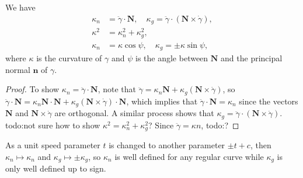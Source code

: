 \begin{prop}
    We have 
    \begin{align*}
        \kappa_n &=\ddot \gamma \cdot \mathbf N,\quad \kappa_g = \ddot \gamma \cdot (\mathbf N\times \dot \gamma ),\\
        \kappa^2&=\kappa_n ^2+\kappa_g^2,\\
        \kappa_n &=\kappa \cos \psi, \quad \kappa_g =\pm \kappa\sin \psi,
    \end{align*}
    where $\kappa$ is the curvature of $\gamma $ and $\psi$ is the angle between $\mathbf N$ and the principal normal $\mathbf n$ of $\gamma $.
\end{prop}
\begin{proof}
    To show $\kappa_n =\ddot \gamma \cdot \mathbf N$, note that $\ddot \gamma =\kappa_n \mathbf N+\kappa_g(\mathbf N\times \dot \gamma )$, so $\ddot \gamma \cdot \mathbf N=\kappa_n \mathbf N\cdot \mathbf N+\kappa_g (\mathbf N\times \dot \gamma )\cdot \mathbf N$, which implies that $\ddot \gamma \cdot \mathbf N=\kappa_n $ since the vectors $\mathbf N$ and $\mathbf N\times \dot\gamma $ are orthogonal. A similar process shows that $\kappa_g=\ddot \gamma \cdot (\mathbf N\times \dot \gamma )$. {\color{red}todo:not sure how to show $\kappa^2=\kappa_n ^2+\kappa_g^2$?} Since $\ddot \gamma =\kappa n$, {\color{red}todo:?} 
\end{proof}
As a unit speed parameter $t$ is changed to another parameter $\pm t+c$, then $\kappa_n \mapsto \kappa_n $ and $\kappa_g \mapsto  \pm \kappa_g$, so $\kappa_n $ is well defined for any regular curve while $\kappa_g$ is only well defined up to sign.

